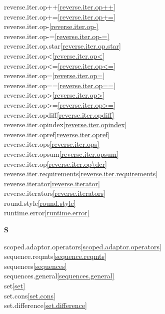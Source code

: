 \begin{multicols}{2}
reverse.iter.op++\quad\ref{reverse.iter.op++}\\
reverse.iter.op+=\quad\ref{reverse.iter.op+=}\\
reverse.iter.op-\quad\ref{reverse.iter.op-}\\
reverse.iter.op-=\quad\ref{reverse.iter.op-=}\\
reverse.iter.op.star\quad\ref{reverse.iter.op.star}\\
reverse.iter.op<\quad\ref{reverse.iter.op<}\\
reverse.iter.op<=\quad\ref{reverse.iter.op<=}\\
reverse.iter.op=\quad\ref{reverse.iter.op=}\\
reverse.iter.op==\quad\ref{reverse.iter.op==}\\
reverse.iter.op>\quad\ref{reverse.iter.op>}\\
reverse.iter.op>=\quad\ref{reverse.iter.op>=}\\
reverse.iter.opdiff\quad\ref{reverse.iter.opdiff}\\
reverse.iter.opindex\quad\ref{reverse.iter.opindex}\\
reverse.iter.opref\quad\ref{reverse.iter.opref}\\
reverse.iter.ops\quad\ref{reverse.iter.ops}\\
reverse.iter.opsum\quad\ref{reverse.iter.opsum}\\
reverse.iter.op\dcr\quad\ref{reverse.iter.op\dcr}\\
reverse.iter.requirements\quad\ref{reverse.iter.requirements}\\
reverse.iterator\quad\ref{reverse.iterator}\\
reverse.iterators\quad\ref{reverse.iterators}\\
round.style\quad\ref{round.style}\\
runtime.error\quad\ref{runtime.error}\\
\par \textbf{S}\par
scoped.adaptor.operators\quad\ref{scoped.adaptor.operators}\\
sequence.reqmts\quad\ref{sequence.reqmts}\\
sequences\quad\ref{sequences}\\
sequences.general\quad\ref{sequences.general}\\
set\quad\ref{set}\\
set.cons\quad\ref{set.cons}\\
set.difference\quad\ref{set.difference}\\

\end{multicols}
